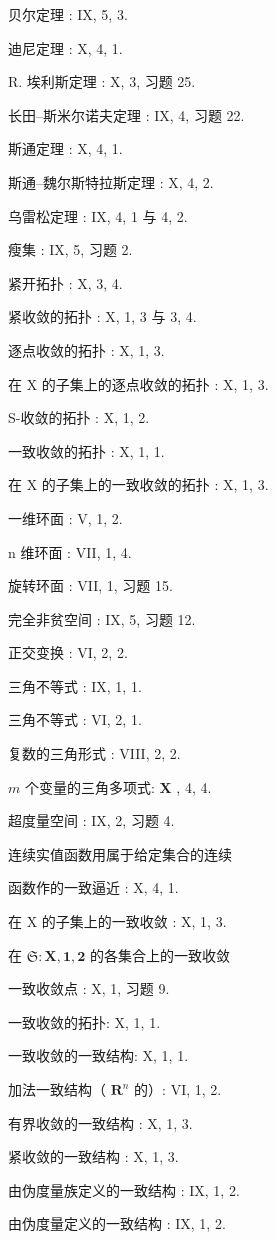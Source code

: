 贝尔定理 : IX, 5, 3.

迪尼定理 : X, 4, 1.

R. 埃利斯定理 : X, 3, 习题 25.

长田–斯米尔诺夫定理 : IX, 4, 习题 22.

斯通定理 : X, 4, 1.

斯通–魏尔斯特拉斯定理 : X, 4, 2.

乌雷松定理 : IX, 4, 1 与 4, 2.

瘦集 : IX, 5, 习题 2.

紧开拓扑 : X, 3, 4.

紧收敛的拓扑 : X, 1, 3 与 3, 4.

逐点收敛的拓扑 : X, 1, 3.

在 X 的子集上的逐点收敛的拓扑 : X, 1, 3.

S-收敛的拓扑 : X, 1, 2.

一致收敛的拓扑 : X, 1, 1.

在 X 的子集上的一致收敛的拓扑 : X, 1, 3.

一维环面 : V, 1, 2.

n 维环面 : VII, 1, 4.

旋转环面 : VII, 1, 习题 15.

完全非贫空间 : IX, 5, 习题 12.

正交变换 : VI, 2, 2.

三角不等式 : IX, 1, 1.

三角不等式 : VI, 2, 1.

复数的三角形式 : VIII, 2, 2.

\(m\) 个变量的三角多项式: \(\mathbf{X}\) , 4, 4.

超度量空间 : IX, 2, 习题 4.

连续实值函数用属于给定集合的连续

函数作的一致逼近 : X, 4, 1.

在 X 的子集上的一致收敛 : X, 1, 3.

在 \(\mathfrak{S}:\mathbf{X},\mathbf{1},\mathbf{2}\) 的各集合上的一致收敛

一致收敛点 : X, 1, 习题 9.

一致收敛的拓扑: X, 1, 1.

一致收敛的一致结构: X, 1, 1.

加法一致结构（ \(\mathbf{R}^n\) 的）: VI, 1, 2.

有界收敛的一致结构 : X, 1, 3.

紧收敛的一致结构 : X, 1, 3.

由伪度量族定义的一致结构 : IX, 1, 2.

由伪度量定义的一致结构 : IX, 1, 2.

